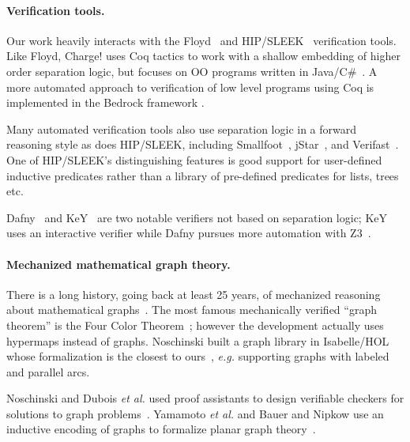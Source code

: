 \vspace{-1ex}
\paragraph{Verification tools.}
Our work heavily interacts with the Floyd~\cite{appel:programlogics} and HIP/SLEEK~\cite{chin:hipsleek} verification tools.  Like Floyd, Charge! uses Coq tactics to work with a shallow embedding of higher order separation logic, but focuses on OO programs written in Java/C\#~\cite{bengtson:charge}.  A  more automated approach to verification of low level programs using Coq is implemented in the Bedrock framework \cite{chlipala:bedrock}.

Many automated verification tools also use separation logic in a forward reasoning style as does HIP/SLEEK, including Smallfoot~\cite{berdine:smallfoot}, jStar~\cite{DistefanoP08}, and Verifast~\cite{jacobs:verifast}.  One of HIP/SLEEK's distinguishing features is good support for user-defined inductive predicates rather than a library of pre-defined predicates for lists, trees etc.

Dafny~\cite{Leino10} and KeY~\cite{Beckert:2007} are two notable verifiers not based on separation logic; KeY uses an interactive verifier while Dafny pursues more automation with Z3~\cite{Moura2008}.

\vspace{-1ex}
\paragraph{Mechanized mathematical graph theory.} There is a long history,
going back at least 25 years, of mechanized reasoning about mathematical
graphs~\cite{wong1991}.  The most famous mechanically verified ``graph theorem''
is the Four Color Theorem~\cite{gonthier2005computer}; however
the development actually uses hypermaps instead of graphs.
Noschinski built a graph library in Isabelle/HOL whose formalization
is the closest to ours~\cite{Noschinski2015}, \emph{e.g.} supporting
graphs with labeled and parallel arcs.

Noschinski and Dubois \emph{et al.} used proof assistants to design verifiable
checkers for solutions to graph problems~\cite{noschinski2015formalizing,dubois2015graphes}.
Yamamoto \emph{et al.} and Bauer and Nipkow use an inductive
encoding of graphs to formalize planar graph theory~\cite{yamamoto1995formalization,bauer20025}.





